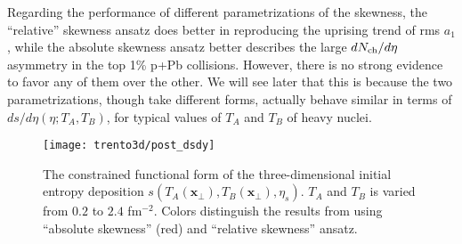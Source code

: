 Regarding the performance of different parametrizations of the skewness, the ``relative'' skewness ansatz does better in reproducing the uprising trend of rms $a_1$, while the absolute skewness ansatz better describes the large $dN_\text{ch}/d\eta$ asymmetry in the top 1\% p+Pb collisions.
However, there is no strong evidence to favor any of them over the other.
We will see later that this is because the two parametrizations, though take different forms, actually behave similar in terms of $ds/d\eta(\eta; T_A, T_B)$, for typical values of $T_A$ and $T_B$ of heavy nuclei.

\begin{figure}
\centering
\texttt{[image: trento3d/post\_dsdy]}
\caption{The constrained functional form of the three-dimensional initial entropy deposition $s(T_A(\mathbf{x}_\perp), T_B(\mathbf{x}_\perp), \eta_s)$. $T_A$ and $T_B$ is varied from $0.2$ to $2.4$ fm${}^{-2}$. Colors distinguish the results from using ``absolute skewness'' (red) and ``relative skewness'' ansatz.}
\label{fig:trento:post_dsdy}
\end{figure}

